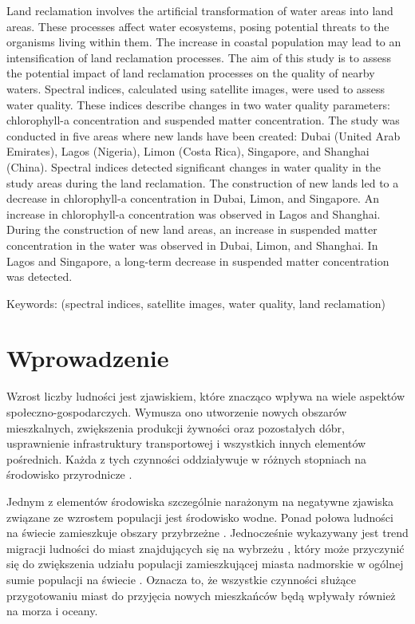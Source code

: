\documentclass{amuthesis}
\begin{document}
Land reclamation involves the artificial transformation of water areas
into land areas. These processes affect water ecosystems, posing
potential threats to the organisms living within them. The increase in
coastal population may lead to an intensification of land reclamation
processes. The aim of this study is to assess the potential impact of
land reclamation processes on the quality of nearby waters. Spectral
indices, calculated using satellite images, were used to assess water
quality. These indices describe changes in two water quality parameters:
chlorophyll-a concentration and suspended matter concentration. The
study was conducted in five areas where new lands have been created:
Dubai (United Arab Emirates), Lagos (Nigeria), Limon (Costa Rica),
Singapore, and Shanghai (China). Spectral indices detected significant
changes in water quality in the study areas during the land reclamation.
The construction of new lands led to a decrease in chlorophyll-a
concentration in Dubai, Limon, and Singapore. An increase in
chlorophyll-a concentration was observed in Lagos and Shanghai. During
the construction of new land areas, an increase in suspended matter
concentration in the water was observed in Dubai, Limon, and Shanghai.
In Lagos and Singapore, a long-term decrease in suspended matter
concentration was detected.

Keywords: (spectral indices, satellite images, water quality, land
reclamation)

\newpage

\sf\tighttoc\doublespacing


\hypertarget{sec-wprowadzenie}{%
\chapter{Wprowadzenie}\label{sec-wprowadzenie}}

Wzrost liczby ludności jest zjawiskiem, które znacząco wpływa na wiele
aspektów społeczno-gospodarczych. Wymusza ono utworzenie nowych obszarów
mieszkalnych, zwiększenia produkcji żywności oraz pozostałych dóbr,
usprawnienie infrastruktury transportowej i wszystkich innych elementów
pośrednich. Każda z tych czynności oddziaływuje w różnych stopniach na
środowisko przyrodnicze \autocite{cropper1994interaction}.

Jednym z elementów środowiska szczególnie narażonym na negatywne
zjawiska związane ze wzrostem populacji jest środowisko wodne. Ponad
połowa ludności na świecie zamieszkuje obszary przybrzeżne
\autocite{seto2011meta}. Jednocześnie wykazywany jest trend migracji
ludności do miast znajdujących się na wybrzeżu
\autocite{hugo2011future}, który może przyczynić się do zwiększenia
udziału populacji zamieszkującej miasta nadmorskie w ogólnej sumie
populacji na świecie \autocite{mcgranahan2007rising}. Oznacza to, że
wszystkie czynności służące przygotowaniu miast do przyjęcia nowych
mieszkańców będą wpływały również na morza i oceany.
\end{document}
